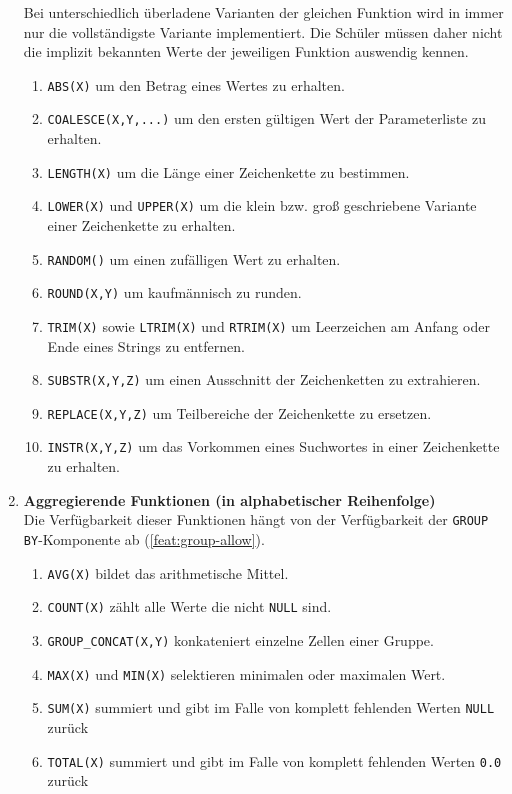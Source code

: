 \begin{enumerate}
  Bei unterschiedlich überladene Varianten der gleichen Funktion wird in \idename immer nur die vollständigste Variante implementiert. Die Schüler müssen daher nicht die implizit bekannten Werte der jeweiligen Funktion auswendig kennen.
  \begin{enumerate}
  \item \label{feat:fun-abs} \texttt{ABS(X)} um den Betrag eines Wertes zu erhalten.
  \item \label{feat:fun-coalesce} \texttt{COALESCE(X,Y,...)} um den ersten gültigen Wert der Parameterliste zu erhalten.
  \item \label{feat:fun-length} \texttt{LENGTH(X)} um die Länge einer Zeichenkette zu bestimmen.
  \item \label{feat:fun-casing} \texttt{LOWER(X)} und \texttt{UPPER(X)} um die klein bzw. groß geschriebene Variante einer Zeichenkette zu erhalten.
  \item \label{feat:fun-random} \texttt{RANDOM()} um einen zufälligen Wert zu erhalten.
  \item \label{feat:fun-round} \texttt{ROUND(X,Y)} um kaufmännisch zu runden.
  \item \label{feat:fun-trim} \texttt{TRIM(X)} sowie \texttt{LTRIM(X)} und \texttt{RTRIM(X)} um Leerzeichen am Anfang oder Ende eines Strings zu entfernen.
  \item \label{feat:fun-substr} \texttt{SUBSTR(X,Y,Z)} um einen Ausschnitt der Zeichenketten zu extrahieren.
  \item \label{feat:fun-replace} \texttt{REPLACE(X,Y,Z)} um Teilbereiche der Zeichenkette zu ersetzen.
  \item \label{feat:fun-instr} \texttt{INSTR(X,Y,Z)} um das Vorkommen eines Suchwortes in einer Zeichenkette zu erhalten.
  \end{enumerate}

\item \textbf{Aggregierende Funktionen (in alphabetischer Reihenfolge)} \\
  Die Verfügbarkeit dieser Funktionen hängt von der Verfügbarkeit der \texttt{GROUP BY}-Komponente ab (\ref{feat:group-allow}).
  \begin{enumerate}
  \item \label{feat:fun-avg} \texttt{AVG(X)} bildet das arithmetische Mittel.
  \item \label{feat:fun-count} \texttt{COUNT(X)} zählt alle Werte die nicht \lstinline{NULL} sind.
  \item \label{feat:fun-group-concat} \texttt{GROUP\_CONCAT(X,Y)} konkateniert einzelne Zellen einer Gruppe.
  \item \label{feat:fun-max-min} \texttt{MAX(X)} und \texttt{MIN(X)} selektieren minimalen oder maximalen Wert.
  \item \label{feat:fun-sum} \texttt{SUM(X)} summiert und gibt im Falle von komplett fehlenden Werten \texttt{NULL} zurück
  \item \label{feat:fun-total} \texttt{TOTAL(X)} summiert und gibt im Falle von komplett fehlenden Werten \texttt{0.0} zurück
  \end{enumerate}
\end{enumerate}

